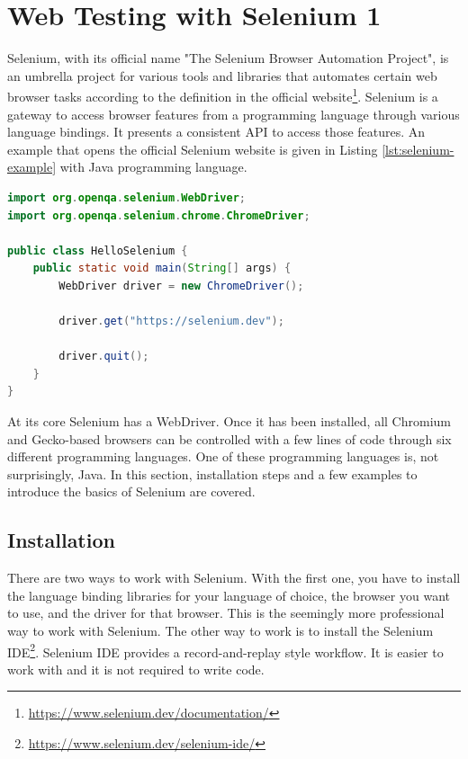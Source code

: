 \chapter{Web Testing with Selenium 1}
Selenium, with its official name "The Selenium Browser Automation Project", is an umbrella project for various tools and libraries that automates certain web browser tasks according to the definition in the official website\footnote{\url{https://www.selenium.dev/documentation/}}. Selenium is a gateway to access browser features from a programming language through various language bindings. It presents a consistent API to access those features. An example that opens the official Selenium website is given in Listing \ref{lst:selenium-example} with Java programming language.

\begin{lstlisting}[language=java,caption={A Java program that opens the official Selenium website through a Chrome-based browser.}, label=lst:selenium-example]
import org.openqa.selenium.WebDriver;
import org.openqa.selenium.chrome.ChromeDriver;

public class HelloSelenium {
    public static void main(String[] args) {
        WebDriver driver = new ChromeDriver();

        driver.get("https://selenium.dev");

        driver.quit();
    }
}
\end{lstlisting}

At its core Selenium has a WebDriver. Once it has been installed, all Chromium and Gecko-based browsers can be controlled with a few lines of code through six different programming languages. One of these programming languages is, not surprisingly, Java. In this section, installation steps and a few examples to introduce the basics of Selenium are covered.

\section{Installation}
There are two ways to work with Selenium. With the first one, you have to install the language binding libraries for your language of choice, the browser you want to use, and the driver for that browser. This is the seemingly more professional way to work with Selenium. The other way to work is to install the Selenium IDE\footnote{\url{https://www.selenium.dev/selenium-ide/}}. Selenium IDE provides a record-and-replay style workflow. It is easier to work with and it is not required to write code.

